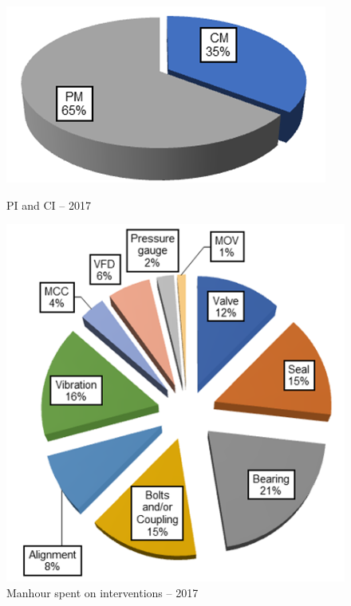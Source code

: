 \begin{figure}[!htb]

\begin{minipage}[b]{0.5\linewidth}
	\centering
	\includegraphics[width=\textwidth]{figures/ch02_distributionofintervention2017}
	\caption{PI and CI – 2017}
	\label{ch02_distributionofintervention2017}
\end{minipage}
	\hspace{0.05cm}
	\begin{minipage}[b]{0.5\linewidth}
		\centering
		\includegraphics[width=\textwidth]{figures/ch02_interventionitem2017}
		\caption{Manhour spent on interventions – 2017}
		\label{ch02_interventionitem2017}
	\end{minipage}

\end{figure}


